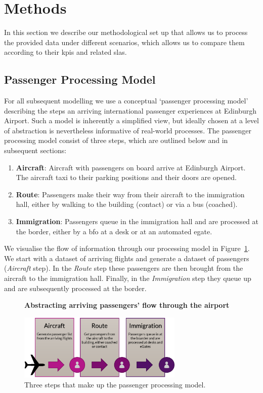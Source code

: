 \documentclass[10pt]{article}
\newcommand*{\figuretitle}[1]{%
    {\centering%
    \textbf{#1}%
    \par\medskip}%
}
\begin{document}
\section{Methods} \label{sec:methods}

In this section we describe our methodological set up that allows us to process the provided data under different scenarios, which allows us to compare them according to their \glspl{kpi} and related \glspl{sla}.

\subsection{Passenger Processing Model}

    For all subsequent modelling we use a conceptual `passenger processing model' describing the steps an arriving international passenger experiences at Edinburgh Airport. Such a model is inherently a simplified view, but ideally chosen at a level of abstraction is nevertheless informative of real-world processes. The passenger processing model consist of three steps, which are outlined below and in subsequent sections:
\begin{enumerate}
    \item \textbf{Aircraft}: Aircraft with passengers on board arrive at Edinburgh Airport. The aircraft taxi to their parking positions and their doors are opened. \label{step:aircraft}
    \item \textbf{Route}: Passengers make their way from their aircraft to the immigration hall, either by walking to the building (contact) or via a bus (coached). \label{step:route}
    \item \textbf{Immigration}: Passengers queue in the immigration hall and are processed at the border, either by a \gls{bfo} at a desk or at an automated \gls{egate}. \label{step:immigration}
\end{enumerate}
 We visualise the flow of information through our processing model in Figure~\ref{fig:PPM_threesteps}. We start with a dataset of arriving flights and generate a dataset of passengers (\textit{Aircraft} step). In the \textit{Route} step these passengers are then brought from the aircraft to the immigration hall. Finally, in the \textit{Immigration} step they queue up and are subsequently processed at the border.

\begin{figure}[!ht]
    \centering
    \figuretitle{Abstracting arriving passengers' flow through the airport}
    \includegraphics[width=0.7\textwidth]{figures/ThreeSteps.png}
     \caption{Three steps that make up the passenger processing model.} \label{fig:PPM_threesteps}
\end{figure}
\end{document}
